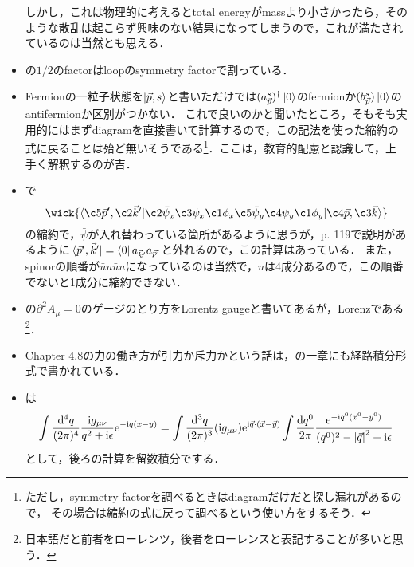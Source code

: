 \begin{itemize}
		しかし，これは物理的に考えるとtotal energyがmassより小さかったら，そのような散乱は起こらず興味のない結果になってしまうので，これが満たされているのは当然とも思える．
	\item {}の$1/2$のfactorはloopのsymmetry factorで割っている．

	\item Fermionの一粒子状態を$\ket{\vec{p}, s}$と書いただけでは$(a_{\vec{p}}^s)^{\dagger}\ket{0}$のfermionか$(b_{\vec{p}}^s)\ket{0}$のantifermionか区別がつかない．
		これで良いのかと聞いたところ，そもそも実用的にはまずdiagramを直接書いて計算するので，この記法を使った縮約の式に戻ることは殆ど無いそうである\footnote{ただし，symmetry factorを調べるときはdiagramだけだと探し漏れがあるので，
		その場合は縮約の式に戻って調べるという使い方をするそう．}．ここは，教育的配慮と認識して，上手く解釈するのが吉．
	\item {}で
		\begin{equation}
			\wick{\langle \c5{\vec{p}'}, \c2{\vec{k}'}\rvert \c2{\bar{\psi}_x}\c3{\psi_x}\c1{\phi_x}\c5{\bar{\psi}_y}\c4{\psi_y}\c1{\phi_y}\lvert \c4{\vec{p}}, \c3{\vec{k}}\rangle} 
		\end{equation}
		の縮約で，$\bar{\psi}$が入れ替わっている箇所があるように思うが，p. 119で説明があるように$\bra*{\vec{p}', \vec{k}'} = \bra{0}a_{\vec{k}'}a_{\vec{p}'}$と外れるので，この計算はあっている．
		また，spinorの順番が$\bar{u}u\bar{u}u$になっているのは当然で，$u$は4成分あるので，この順番でないと1成分に縮約できない．
	\item {}の$\partial^2A_{\mu} = 0$のゲージのとり方をLorentz gaugeと書いてあるが，Lorenzである
		\footnote{日本語だと前者をローレンツ，後者をローレンスと表記することが多いと思う．}．
	\item Chapter 4.8の力の働き方が引力か斥力かという話は，\cite{Zee:2003mt}の一章にも経路積分形式で書かれている．
	\item {}は
		\begin{equation}
			\int \frac{\dd[4]{q}}{(2\pi)^{4}}\frac{\mathrm{i} g_{\mu\nu}}{q^2+\mathrm{i}\epsilon}\mathrm{e}^{-\mathrm{i} q(x-y)}
			= \int \frac{\dd[3]{q}}{(2\pi)^{3}}(\mathrm{i} g_{\mu\nu})\mathrm{e}^{\mathrm{i}\vec{q}\cdot (\vec{x}-\vec{y})}\int\frac{\dd{q^0}}{2\pi} \frac{\mathrm{e}^{- \mathrm{i} q^0(x^0-y^0)}}{(q^0)^2-\abs{\vec{q}}^2 + \mathrm{i}\epsilon}
		\end{equation}
		として，後ろの計算を留数積分でする．


\end{itemize}
